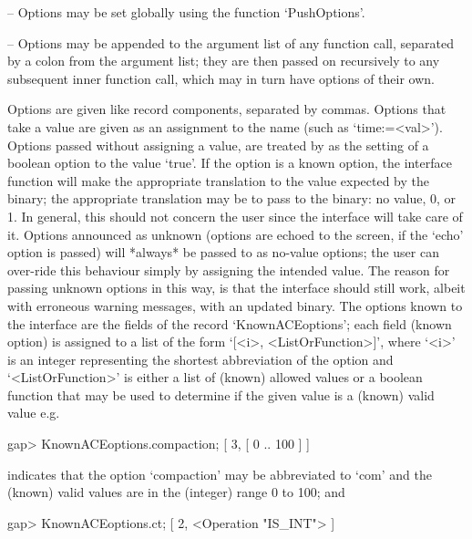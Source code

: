 \beginlist

\item{--} Options may be set globally using the function `PushOptions'.

\item{--} Options may be appended to the argument list of any function
call,  separated by a  colon from  the argument  list;  they  are then
passed on recursively to any subsequent inner function call, which may
in turn have options of their own.


\endlist

Options are given like record components, separated by commas. Options
that take a value are given as an assignment  to  the  name  (such  as
`time:=<val>'). Options passed without assigning a value, are  treated
by {\GAP} as the setting of a boolean option to the value  `true'.  If
the option is a known {\ACE} option,  the  {\ACE}  interface  function
will make the appropriate translation to the  value  expected  by  the
{\ACE} binary; the appropriate translation  may  be  to  pass  to  the
binary: no value, 0, or 1. In general, this  should  not  concern  the
user since  the  {\ACE}  interface  will  take  care  of  it.  Options
announced as unknown (options are echoed to the screen, if the  `echo'
option is passed) will  *always*  be  passed  to  {\ACE}  as  no-value
options; the user can over-ride this behaviour simply by assigning the
intended value. The reason for passing unknown options in this way, is
that the {\ACE} interface should still  work,  albeit  with  erroneous
warning messages, with an updated binary. The {\ACE} options known  to
the {\ACE} interface are the fields of the  record  `KnownACEoptions';
each field (known {\ACE} option) is assigned to a  list  of  the  form
`[<i>, <ListOrFunction>]', where `<i>' is an integer representing  the
shortest abbreviation of the option and `<ListOrFunction>' is either a
list of (known) allowed values or a boolean function that may be  used
to determine if the given value is a (known) valid value e.g.

\begintt
gap> KnownACEoptions.compaction;
[ 3, [ 0 .. 100 ] ]
\endtt

indicates that the option `compaction' may be  abbreviated  to  `com'
and the (known) valid values are in the (integer) range 0 to 100; and

\begintt
gap> KnownACEoptions.ct;
[ 2, <Operation "IS_INT"> ]
\endtt

